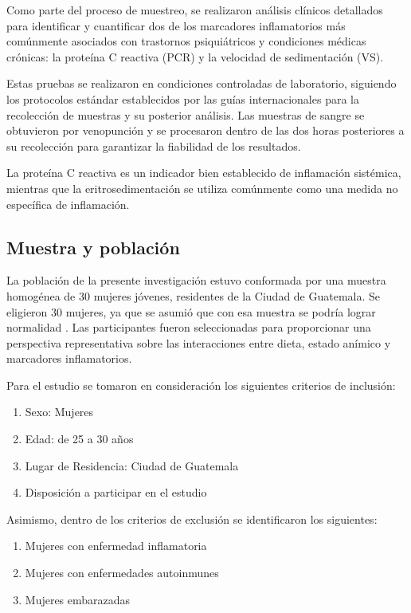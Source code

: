 \documentclass[stu, 12pt]{apa7}
\begin{document}
	Como parte del proceso de muestreo, se realizaron análisis clínicos detallados para identificar y cuantificar dos de los marcadores inflamatorios más comúnmente asociados con trastornos psiquiátricos y condiciones médicas crónicas: la proteína C reactiva (PCR) y la velocidad de sedimentación (VS).

	Estas pruebas se realizaron en condiciones controladas de laboratorio, siguiendo los protocolos estándar establecidos por las guías internacionales para la recolección de muestras y su posterior análisis. Las muestras de sangre se obtuvieron por venopunción y se procesaron dentro de las dos horas posteriores a su recolección para garantizar la fiabilidad de los resultados.

	La proteína C reactiva es un indicador bien establecido de inflamación sistémica, mientras que la eritrosedimentación se utiliza comúnmente como una medida no específica de inflamación.

	\subsection{Muestra y población}\label{muestra-y-poblaciuxf3n}

	La población de la presente investigación estuvo conformada por una
	muestra homogénea de 30 mujeres jóvenes, residentes de la Ciudad de
	Guatemala. Se eligieron 30 mujeres, ya que se asumió que con esa muestra
	se podría lograr normalidad \parencite{Hernandez2018}. Las
	participantes fueron seleccionadas para proporcionar una perspectiva
	representativa sobre las interacciones entre dieta, estado anímico y
	marcadores inflamatorios.

	Para el estudio se tomaron en consideración los siguientes criterios de
	inclusión:
	\begin{enumerate}
		\item Sexo: Mujeres
		\item Edad: de 25 a 30 años
		\item Lugar de Residencia: Ciudad de Guatemala
		\item Disposición a participar en el estudio
	\end{enumerate}


	Asimismo, dentro de los criterios de exclusión se identificaron los
	siguientes: 

	\begin{enumerate}
		\item Mujeres con enfermedad inflamatoria
		\item Mujeres con enfermedades autoinmunes
		\item Mujeres embarazadas
	\end{enumerate}
	
\end{document}
